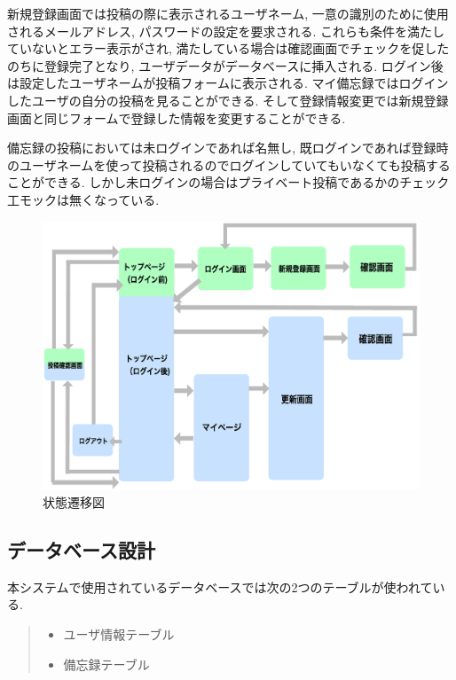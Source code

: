 \documentclass[submit,techrep]{ipsj}
\begin{document}
新規登録画面では投稿の際に表示されるユーザネーム, 一意の識別のために使用されるメールアドレス, パスワードの設定を要求される. これらも条件を満たしていないとエラー表示がされ, 満たしている場合は確認画面でチェックを促したのちに登録完了となり, ユーザデータがデータベースに挿入される. ログイン後は設定したユーザネームが投稿フォームに表示される. マイ備忘録ではログインしたユーザの自分の投稿を見ることができる. そして登録情報変更では新規登録画面と同じフォームで登録した情報を変更することができる. 

備忘録の投稿においては未ログインであれば名無し, 既ログインであれば登録時のユーザネームを使って投稿されるのでログインしていてもいなくても投稿することができる. しかし未ログインの場合はプライベート投稿であるかのチェック工モックは無くなっている. 

\begin{figure}[h]
 \centering
 \includegraphics[scale=0.17]{systemScreen.eps}
\caption{状態遷移図}
 \label{システム}
\end{figure}

\subsection{データベース設計}
本システムで使用されているデータベースでは次の2つのテーブルが使われている. 
\begin{quote}
 \begin{itemize}
  \item ユーザ情報テーブル
  \item 備忘録テーブル
 \end{itemize}
\end{quote}
\end{document}
